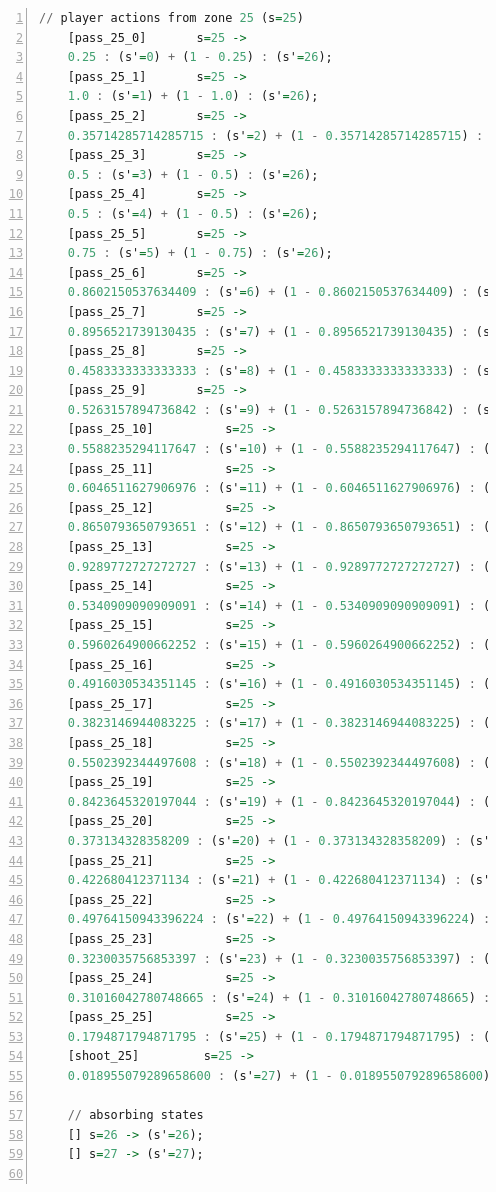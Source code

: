 \documentclass{l4proj}
\begin{document}
\begin{appendices}
\begin{lstlisting}[language=Haskell, numbers=left, caption=MDP used for strategy generation. This is the model specification as-is after the refinements at the end of chapter 3.]
	// player actions from zone 25 (s=25)
	[pass_25_0]	      s=25 ->
	0.25 : (s'=0) + (1 - 0.25) : (s'=26);
	[pass_25_1]	      s=25 ->
	1.0 : (s'=1) + (1 - 1.0) : (s'=26);
	[pass_25_2]	      s=25 ->
	0.35714285714285715 : (s'=2) + (1 - 0.35714285714285715) : (s'=26);
	[pass_25_3]	      s=25 ->
	0.5 : (s'=3) + (1 - 0.5) : (s'=26);
	[pass_25_4]	      s=25 ->
	0.5 : (s'=4) + (1 - 0.5) : (s'=26);
	[pass_25_5]	      s=25 ->
	0.75 : (s'=5) + (1 - 0.75) : (s'=26);
	[pass_25_6]	      s=25 ->
	0.8602150537634409 : (s'=6) + (1 - 0.8602150537634409) : (s'=26);
	[pass_25_7]	      s=25 ->
	0.8956521739130435 : (s'=7) + (1 - 0.8956521739130435) : (s'=26);
	[pass_25_8]	      s=25 ->
	0.4583333333333333 : (s'=8) + (1 - 0.4583333333333333) : (s'=26);
	[pass_25_9]	      s=25 ->
	0.5263157894736842 : (s'=9) + (1 - 0.5263157894736842) : (s'=26);
	[pass_25_10]	      s=25 ->
	0.5588235294117647 : (s'=10) + (1 - 0.5588235294117647) : (s'=26);
	[pass_25_11]	      s=25 ->
	0.6046511627906976 : (s'=11) + (1 - 0.6046511627906976) : (s'=26);
	[pass_25_12]	      s=25 ->
	0.8650793650793651 : (s'=12) + (1 - 0.8650793650793651) : (s'=26);
	[pass_25_13]	      s=25 ->
	0.9289772727272727 : (s'=13) + (1 - 0.9289772727272727) : (s'=26);
	[pass_25_14]	      s=25 ->
	0.5340909090909091 : (s'=14) + (1 - 0.5340909090909091) : (s'=26);
	[pass_25_15]	      s=25 ->
	0.5960264900662252 : (s'=15) + (1 - 0.5960264900662252) : (s'=26);
	[pass_25_16]	      s=25 ->
	0.4916030534351145 : (s'=16) + (1 - 0.4916030534351145) : (s'=26);
	[pass_25_17]	      s=25 ->
	0.3823146944083225 : (s'=17) + (1 - 0.3823146944083225) : (s'=26);
	[pass_25_18]	      s=25 ->
	0.5502392344497608 : (s'=18) + (1 - 0.5502392344497608) : (s'=26);
	[pass_25_19]	      s=25 ->
	0.8423645320197044 : (s'=19) + (1 - 0.8423645320197044) : (s'=26);
	[pass_25_20]	      s=25 ->
	0.373134328358209 : (s'=20) + (1 - 0.373134328358209) : (s'=26);
	[pass_25_21]	      s=25 ->
	0.422680412371134 : (s'=21) + (1 - 0.422680412371134) : (s'=26);
	[pass_25_22]	      s=25 ->
	0.49764150943396224 : (s'=22) + (1 - 0.49764150943396224) : (s'=26);
	[pass_25_23]	      s=25 ->
	0.3230035756853397 : (s'=23) + (1 - 0.3230035756853397) : (s'=26);
	[pass_25_24]	      s=25 ->
	0.31016042780748665 : (s'=24) + (1 - 0.31016042780748665) : (s'=26);
	[pass_25_25]	      s=25 ->
	0.1794871794871795 : (s'=25) + (1 - 0.1794871794871795) : (s'=26);
	[shoot_25]	       s=25 ->
	0.018955079289658600 : (s'=27) + (1 - 0.018955079289658600) : (s'=26);

	// absorbing states
	[] s=26 -> (s'=26);
	[] s=27 -> (s'=27);


\end{lstlisting}
\end{appendices}
\end{document}
